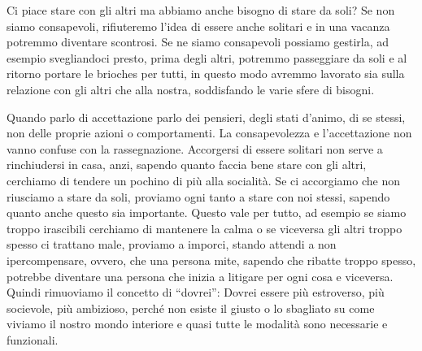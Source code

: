 \documentclass[12pt]{book} %
\begin{document}
\bigskip

Ci piace stare con gli altri ma abbiamo anche bisogno di stare da soli? Se non siamo consapevoli, rifiuteremo
l'idea di essere anche solitari e in una vacanza potremmo diventare scontrosi. Se ne siamo
consapevoli possiamo gestirla, ad esempio svegliandoci presto, prima degli altri, potremmo passeggiare da soli e al
ritorno portare le brioches per tutti, in questo modo avremmo lavorato sia sulla relazione con gli altri che alla
nostra, soddisfando le varie sfere di bisogni.


\bigskip

Quando parlo di accettazione parlo dei pensieri, degli stati d'animo, di se stessi, non delle
proprie azioni o comportamenti. La consapevolezza e l'accettazione non vanno confuse con la
rassegnazione. Accorgersi di essere solitari non serve a rinchiudersi in casa, anzi, sapendo quanto faccia bene stare
con gli altri, cerchiamo di tendere un pochino di più alla socialità. Se ci accorgiamo che non riusciamo a stare da
soli, proviamo ogni tanto a stare con noi stessi, sapendo quanto anche questo sia importante. Questo vale per tutto, ad
esempio se siamo troppo irascibili cerchiamo di mantenere la calma o se viceversa gli altri troppo spesso ci trattano
male, proviamo a imporci, stando attendi a non ipercompensare, ovvero, che una persona mite, sapendo che ribatte troppo
spesso, potrebbe diventare una persona che inizia a litigare per ogni cosa e viceversa. Quindi rimuoviamo il concetto
di “dovrei”: Dovrei essere più estroverso, più socievole, più ambizioso, perché non esiste il giusto o lo sbagliato su
come viviamo il nostro mondo interiore e quasi tutte le modalità sono necessarie e funzionali.


\bigskip
\end{document}
